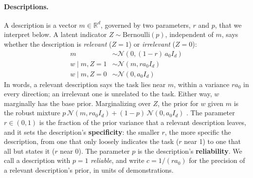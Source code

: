 \documentclass{article}
\newcommand{\R}{\mathbb{R}}
\begin{document}
\paragraph{Descriptions.} A description is a vector $m \in \R^d$, governed by two parameters, $r$ and $p$, that we interpret below. A latent indicator $Z \sim \mathrm{Bernoulli}(p)$, independent of $m$, says whether the description is \emph{relevant} ($Z = 1$) or \emph{irrelevant} ($Z = 0$):
\begin{align*}
    m &\sim \mathcal{N}(0, (1-r)\,a_0 I_d) \\
    w \mid m, Z=1 &\sim \mathcal{N}(m, r a_0 I_d) \\
    w \mid m, Z=0 &\sim \mathcal{N}(0, a_0 I_d)
\end{align*}
In words, a relevant description says the task lies near $m$, within a variance $r a_0$ in every direction; an irrelevant one is unrelated to the task. Either way, $w$ marginally has the base prior. Marginalizing over $Z$, the prior for $w$ given $m$ is the robust mixture $p\,\mathcal{N}(m, r a_0 I_d) + (1-p)\,\mathcal{N}(0, a_0 I_d)$ \citep{schmidli2014}. The parameter $r \in (0, 1)$ is the fraction of the prior variance that a relevant description leaves, and it sets the description's \textbf{specificity}: the smaller $r$, the more specific the description, from one that only loosely indicates the task ($r$ near 1) to one that all but states it ($r$ near 0). The parameter $p$ is the description's \textbf{reliability}. We call a description with $p = 1$ \emph{reliable}, and write $c = 1/(r a_0)$ for the precision of a relevant description's prior, in units of demonstrations.
\end{document}

